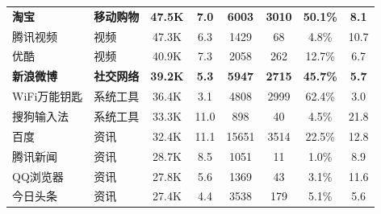 \begin{ThreePartTable}
\begin{longtable}{l l c c c c c c}
        {\bf 淘宝}\tnote{*}                          & {\bf 移动购物} & {\bf 47.5K}                & {\bf 7.0}                  & {\bf 6003}     & {\bf 3010}                 & {\bf 50.1\%} & {\bf 8.1}                  \\
        \rowcolor{gray!15} 腾讯视频                  & 视频           & 47.3K                      & 6.3                        & 1429           & 68                         & 4.8\%        & 10.7                       \\
        优酷                                         & 视频           & 40.9K                      & 7.3                        & 2058           & 262                        & 12.7\%       & 6.7                        \\
        {\bf 新浪微博}\tnote{*}                      & {\bf 社交网络} & {\bf 39.2K}                & {\bf 5.3}                  & {\bf 5947}     & {\bf 2715}                 & {\bf 45.7\%} & {\bf 5.7}                  \\
        \rowcolor{gray!15} WiFi万能钥匙              & 系统工具       & 36.4K                      & 3.1                        & 4808           & 2999                       & 62.4\%       & 3.0                        \\
        搜狗输入法                                   & 系统工具       & 33.3K                      & 11.0                       & 898            & 40                         & 4.5\%        & 21.8                       \\
        \rowcolor{gray!15} 百度                      & 资讯           & 32.4K                      & 11.1                       & 15651          & 3514                       & 22.5\%       & 12.8                       \\
        腾讯新闻                                     & 资讯           & 28.7K                      & 8.5                        & 1051           & 11                         & 1.0\%        & 8.9                        \\
        \rowcolor{gray!15} QQ浏览器                  & 资讯           & 27.8K                      & 5.6                        & 1369           & 43                         & 3.1\%        & 11.6                       \\
        今日头条                                     & 资讯           & 27.4K                      & 4.4                        & 3538           & 179                        & 5.1\%        & 5.6                        \\

\end{longtable}
\end{ThreePartTable}

